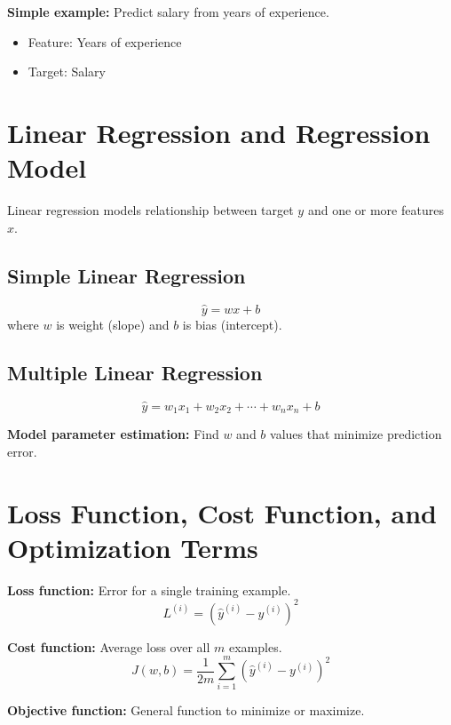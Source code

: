 \documentclass[12pt,a4paper]{article}
\begin{document}
\textbf{Simple example:} Predict salary from years of experience.
\begin{itemize}[noitemsep]
    \item Feature: Years of experience
    \item Target: Salary
\end{itemize}

\section{\textcolor{primary}{Linear Regression and Regression Model}}

Linear regression models relationship between target $y$ and one or more features $x$.

\subsection*{Simple Linear Regression}
\begin{equation}
\hat{y} = w x + b
\end{equation}
where $w$ is weight (slope) and $b$ is bias (intercept).

\subsection*{Multiple Linear Regression}
\begin{equation}
\hat{y} = w_1x_1 + w_2x_2 + \cdots + w_nx_n + b
\end{equation}

\textbf{Model parameter estimation:} Find $w$ and $b$ values that minimize prediction error.

\section{\textcolor{primary}{Loss Function, Cost Function, and Optimization Terms}}

\textbf{Loss function:} Error for a single training example.
\begin{equation}
L^{(i)} = (\hat{y}^{(i)} - y^{(i)})^2
\end{equation}

\textbf{Cost function:} Average loss over all $m$ examples.
\begin{equation}
J(w,b) = \frac{1}{2m}\sum_{i=1}^{m}(\hat{y}^{(i)} - y^{(i)})^2
\end{equation}

\textbf{Objective function:} General function to minimize or maximize.
\end{document}
